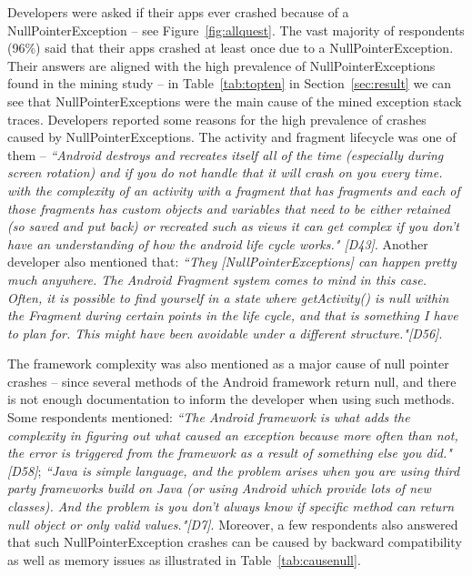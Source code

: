 Developers were asked if their apps ever crashed because of a NullPointerException -- see Figure~\ref{fig:allquest}. The vast majority of respondents (96\%) said that their apps crashed at least once due to a NullPointerException. Their answers are aligned with the high prevalence of NullPointerExceptions found in the mining study -- in Table~\ref{tab:topten} in Section~\ref{sec:result} we can see that NullPointerExceptions were the main cause of the mined exception stack traces. Developers reported some reasons for the high prevalence of crashes caused by NullPointerExceptions. The activity and fragment lifecycle was one of them -- \emph{``Android destroys and recreates itself all of the time (especially during screen rotation) and if you do not handle that it will crash on you every time. with the complexity of an activity with a fragment that has fragments and each of those fragments has custom objects and variables that need to be either retained (so saved and put back) or recreated such as views it can get complex if you don't have an understanding of how the android life cycle works." [D43]}.  Another developer also mentioned that: \emph{``They [NullPointerExceptions] can happen pretty much anywhere. The Android Fragment system comes to mind in this case. Often, it is possible to find yourself in a state where getActivity() is null within the Fragment during certain points in the life cycle, and that is something I have to plan for. This might have been avoidable under a different structure."[D56]}. 

The framework complexity was also mentioned as a major cause of null pointer crashes -- since several methods of the Android framework return null, and there is not enough documentation to inform the developer when using such methods. Some respondents mentioned: \emph{``The Android framework is what adds the complexity in figuring out what caused an exception because more often than not, the error is triggered from the framework as a result of something else you did." [D58]}; \emph{``Java is simple language, and the problem arises when you are using third party frameworks build on Java (or using Android which provide lots of new classes). And the problem is you don't always know if specific method can return null object or only valid values."[D7]}. Moreover, a few respondents also answered that such NullPointerException crashes can be caused by backward compatibility as well as memory issues as illustrated in Table~\ref{tab:causenull}. 

